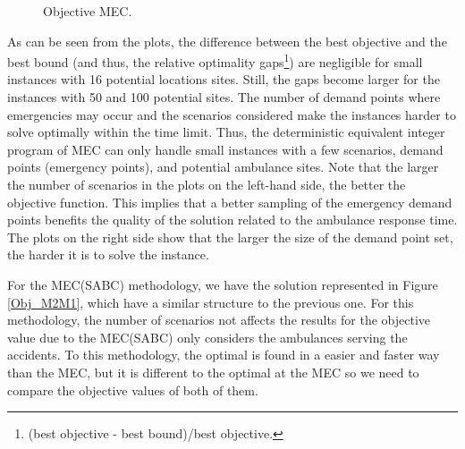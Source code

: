 \begin{figure}[H]
\hspace{0.4cm}%
\vspace{0.4cm}
\caption{Objective MEC.}
\label{Obj_MEC}
\end{figure}


As can be seen from the plots, the difference between the best objective and the best bound (and thus, the relative optimality gaps\footnote{(best objective -  best bound)/best objective.}) are negligible for small instances with 16 potential locations sites. Still, the gaps become larger for the instances with 50 and 100 potential sites. The number of demand points where emergencies may occur and the scenarios considered make the instances harder to solve optimally within the time limit. Thus, the deterministic equivalent integer program of MEC can only handle small instances with a few scenarios, demand points (emergency points), and potential ambulance sites. Note that the larger the number of scenarios in the plots on the left-hand side, the better the objective function. This implies that a better sampling of the emergency demand points benefits the quality of the solution related to the ambulance response time. The plots on the right side show that the larger the size of the demand point set, the harder it is to solve the instance. 

   

For the MEC(SABC) methodology, we have the solution represented in Figure \ref{Obj_M2M1}, which have a similar structure to the previous one. For this methodology, the number of scenarios not affects the results for the objective value due to the MEC(SABC) only considers the ambulances serving the accidents. To this methodology, the optimal is found in a easier and faster way than the MEC, but it is different to the optimal at the MEC so we need to compare the objective values of both of them. 

